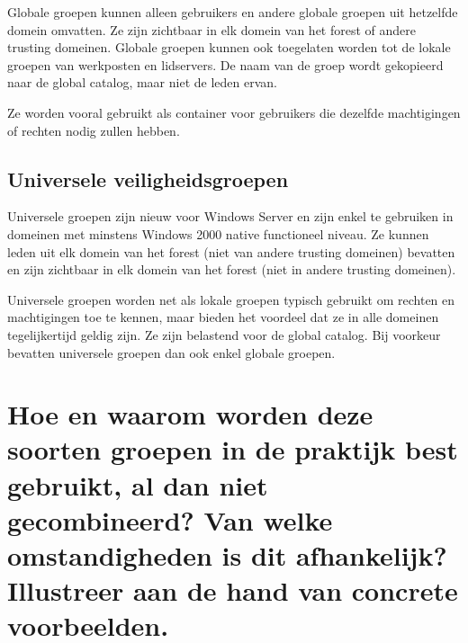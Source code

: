 Globale groepen kunnen alleen gebruikers en andere globale groepen uit hetzelfde
domein omvatten. Ze zijn zichtbaar in elk domein van het forest of andere
trusting domeinen. Globale groepen kunnen ook toegelaten worden tot de lokale
groepen van werkposten en lidservers. De naam van de groep wordt gekopieerd naar
de global catalog, maar niet de leden ervan.

Ze worden vooral gebruikt als container voor gebruikers die dezelfde
machtigingen of rechten nodig zullen hebben.

\subsection{Universele veiligheidsgroepen}

Universele groepen zijn nieuw voor Windows Server en zijn enkel te gebruiken in
domeinen met minstens Windows 2000 native functioneel niveau. Ze kunnen leden
uit elk domein van het forest (niet van andere trusting domeinen) bevatten en
zijn zichtbaar in elk domein van het forest (niet in andere trusting domeinen).

Universele groepen worden net als lokale groepen typisch gebruikt om rechten en
machtigingen toe te kennen, maar bieden het voordeel dat ze in alle domeinen
tegelijkertijd geldig zijn. Ze zijn belastend voor de global catalog. Bij
voorkeur bevatten universele groepen dan ook enkel globale groepen.

\section{Hoe en waarom worden deze soorten groepen in de praktijk best gebruikt,
al dan niet gecombineerd? Van welke omstandigheden is dit afhankelijk?
Illustreer aan de hand van concrete voorbeelden.}


